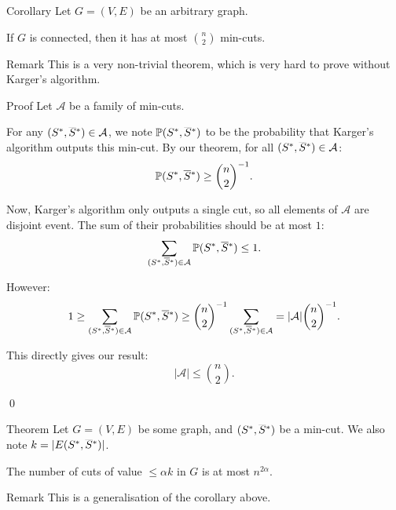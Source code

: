 \documentclass[a4paper]{article}
\begin{document}
\begin{parag}{Corollary}
    Let $G = \left(V, E\right)$ be an arbitrary graph.

    If $G$ is connected, then it has at most $\binom{n}{2}$ min-cuts.

    \begin{subparag}{Remark}
        This is a very non-trivial theorem, which is very hard to prove without Karger's algorithm.
    \end{subparag}

    \begin{subparag}{Proof}
        Let $\mathcal{A}$ be a family of min-cuts.

        For any $\left(S^*, \smash{\bar{S}}^*\right) \in \mathcal{A}$, we note $\prob\left(S^*, \smash{\bar{S}}^*\right)$ to be the probability that Karger's algorithm outputs this min-cut. By our theorem, for all $\left(S^*, \smash{\bar{S}}^*\right) \in \mathcal{A}$: 
        \[\prob\left(S^*, \smash{\bar{S}}^*\right) \geq \binom{n}{2}^{-1}.\]

        Now, Karger's algorithm only outputs a single cut, so all elements of $\mathcal{A}$ are disjoint event. The sum of their probabilities should be at most $1$: 
        \[\sum_{\left(S^*, \smash{\bar{S}}^*\right) \in \mathcal{A}} \prob\left(S^*, \smash{\bar{S}}^*\right) \leq 1.\]

        However: 
        \[1 \geq \sum_{\left(S^*, \smash{\bar{S}}^*\right) \in \mathcal{A}} \prob\left(S^*, \smash{\bar{S}}^*\right) \geq \binom{n}{2}^{-1} \sum_{\left(S^*, \smash{\bar{S}}^*\right) \in \mathcal{A}} = \left|\mathcal{A}\right| \binom{n}{2}^{-1}.\]

        This directly gives our result: 
        \[\left|\mathcal{A}\right| \leq \binom{n}{2}.\]

        \qed
    \end{subparag}
\end{parag}

\begin{parag}{Theorem}
    Let $G = \left(V, E\right)$ be some graph, and $\left(S^*, \smash{\bar{S}}^*\right)$ be a min-cut. We also note $k = \left|E\left(S^*, \smash{\bar{S}}^*\right)\right|$.

    The number of cuts of value $\leq \alpha k$ in $G$ is at most $n^{2 \alpha}$.

    \begin{subparag}{Remark}
        This is a generalisation of the corollary above.
    \end{subparag}
\end{parag}
\end{document}

